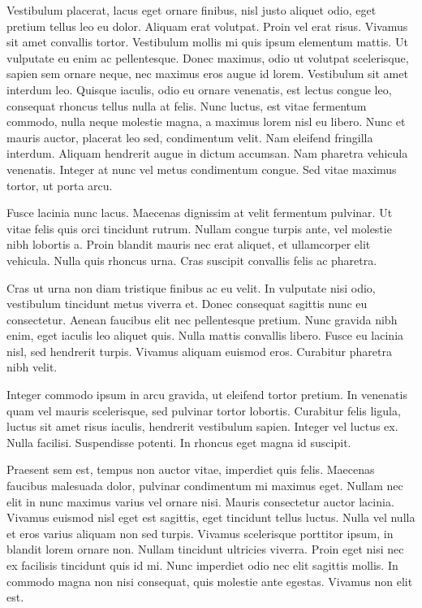 \documentclass{article}
\begin{document}
	Vestibulum placerat, lacus eget ornare finibus, nisl justo aliquet odio, eget pretium tellus leo eu dolor. Aliquam erat volutpat. Proin vel erat risus. Vivamus sit amet convallis tortor. Vestibulum mollis mi quis ipsum elementum mattis. Ut vulputate eu enim ac pellentesque. Donec maximus, odio ut volutpat scelerisque, sapien sem ornare neque, nec maximus eros augue id lorem. Vestibulum sit amet interdum leo. Quisque iaculis, odio eu ornare venenatis, est lectus congue leo, consequat rhoncus tellus nulla at felis. Nunc luctus, est vitae fermentum commodo, nulla neque molestie magna, a maximus lorem nisl eu libero. Nunc et mauris auctor, placerat leo sed, condimentum velit. Nam eleifend fringilla interdum. Aliquam hendrerit augue in dictum accumsan. Nam pharetra vehicula venenatis. Integer at nunc vel metus condimentum congue. Sed vitae maximus tortor, ut porta arcu.
	
	Fusce lacinia nunc lacus. Maecenas dignissim at velit fermentum pulvinar. Ut vitae felis quis orci tincidunt rutrum. Nullam congue turpis ante, vel molestie nibh lobortis a. Proin blandit mauris nec erat aliquet, et ullamcorper elit vehicula. Nulla quis rhoncus urna. Cras suscipit convallis felis ac pharetra.
	
	Cras ut urna non diam tristique finibus ac eu velit. In vulputate nisi odio, vestibulum tincidunt metus viverra et. Donec consequat sagittis nunc eu consectetur. Aenean faucibus elit nec pellentesque pretium. Nunc gravida nibh enim, eget iaculis leo aliquet quis. Nulla mattis convallis libero. Fusce eu lacinia nisl, sed hendrerit turpis. Vivamus aliquam euismod eros. Curabitur pharetra nibh velit.
	
	Integer commodo ipsum in arcu gravida, ut eleifend tortor pretium. In venenatis quam vel mauris scelerisque, sed pulvinar tortor lobortis. Curabitur felis ligula, luctus sit amet risus iaculis, hendrerit vestibulum sapien. Integer vel luctus ex. Nulla facilisi. Suspendisse potenti. In rhoncus eget magna id suscipit.
	
	Praesent sem est, tempus non auctor vitae, imperdiet quis felis. Maecenas faucibus malesuada dolor, pulvinar condimentum mi maximus eget. Nullam nec elit in nunc maximus varius vel ornare nisi. Mauris consectetur auctor lacinia. Vivamus euismod nisl eget est sagittis, eget tincidunt tellus luctus. Nulla vel nulla et eros varius aliquam non sed turpis. Vivamus scelerisque porttitor ipsum, in blandit lorem ornare non. Nullam tincidunt ultricies viverra. Proin eget nisi nec ex facilisis tincidunt quis id mi. Nunc imperdiet odio nec elit sagittis mollis. In commodo magna non nisi consequat, quis molestie ante egestas. Vivamus non elit est.
	
\end{document}
